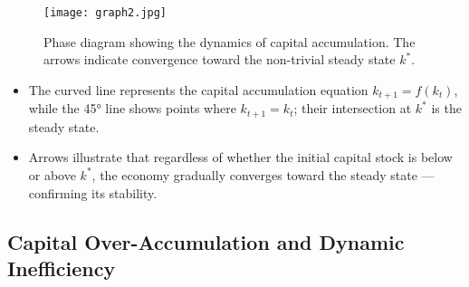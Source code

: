 \documentclass[12pt]{article}
\begin{document}
\begin{figure}[H]
    \centering
    \texttt{[image: graph2.jpg]}
    \caption{Phase diagram showing the dynamics of capital accumulation. The arrows indicate convergence toward the non-trivial steady state \( k^* \).}
    \label{fig:phase_k_dynamics}
\end{figure}

\begin{itemize}
\item The curved line represents the capital accumulation equation \( k_{t+1} = f(k_t) \), while the 45° line shows points where \( k_{t+1} = k_t \); their intersection at \( k^* \) is the steady state.
\item Arrows illustrate that regardless of whether the initial capital stock is below or above \( k^* \), the economy gradually converges toward the steady state — confirming its stability.
\end{itemize}

\subsection*{\noindent\textbf{Capital Over-Accumulation and Dynamic Inefficiency}}
\end{document}
